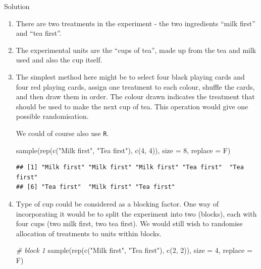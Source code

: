 \documentclass[
]{book}
\newenvironment{Shaded}{\begin{snugshade}}{\end{snugshade}}
\newcommand{\AttributeTok}[1]{\textcolor[rgb]{0.77,0.63,0.00}{#1}}
\newcommand{\CommentTok}[1]{\textcolor[rgb]{0.56,0.35,0.01}{\textit{#1}}}
\newcommand{\DecValTok}[1]{\textcolor[rgb]{0.00,0.00,0.81}{#1}}
\newcommand{\FunctionTok}[1]{\textcolor[rgb]{0.00,0.00,0.00}{#1}}
\newcommand{\NormalTok}[1]{#1}
\newcommand{\StringTok}[1]{\textcolor[rgb]{0.31,0.60,0.02}{#1}}
\theoremstyle{definition}
\theoremstyle{definition}
\theoremstyle{definition}
\theoremstyle{definition}
\theoremstyle{remark}
\begin{document}
Solution

\begin{enumerate}
\def\labelenumi{\alph{enumi}.}
\item
  There are two treatments in the experiment - the two ingredients ``milk first'' and ``tea first''.
\item
  The experimental units are the ``cups of tea'', made up from the tea and milk used and also the cup itself.
\item
  The simplest method here might be to select four black playing cards and four red playing cards, assign one treatment to each colour, shuffle the cards, and then draw them in order. The colour drawn indicates the treatment that should be used to make the next cup of tea. This operation would give one possible randomisation.

  We could of course also use \texttt{R}.

\begin{Shaded}
\begin{Highlighting}[]
\FunctionTok{sample}\NormalTok{(}\FunctionTok{rep}\NormalTok{(}\FunctionTok{c}\NormalTok{(}\StringTok{"Milk first"}\NormalTok{, }\StringTok{"Tea first"}\NormalTok{), }\FunctionTok{c}\NormalTok{(}\DecValTok{4}\NormalTok{, }\DecValTok{4}\NormalTok{)), }\AttributeTok{size =} \DecValTok{8}\NormalTok{, }\AttributeTok{replace =}\NormalTok{ F)}
\end{Highlighting}
\end{Shaded}

\begin{verbatim}
## [1] "Milk first" "Milk first" "Milk first" "Tea first"  "Tea first" 
## [6] "Tea first"  "Milk first" "Tea first"
\end{verbatim}
\item
  Type of cup could be considered as a blocking factor. One way of incorporating it would be to split the experiment into two (blocks), each with four cups (two milk first, two tea first). We would still wish to randomise allocation of treatments to units within blocks.

\begin{Shaded}
\begin{Highlighting}[]
\CommentTok{\# block 1}
\FunctionTok{sample}\NormalTok{(}\FunctionTok{rep}\NormalTok{(}\FunctionTok{c}\NormalTok{(}\StringTok{"Milk first"}\NormalTok{, }\StringTok{"Tea first"}\NormalTok{), }\FunctionTok{c}\NormalTok{(}\DecValTok{2}\NormalTok{, }\DecValTok{2}\NormalTok{)), }\AttributeTok{size =} \DecValTok{4}\NormalTok{, }\AttributeTok{replace =}\NormalTok{ F)}
\end{Highlighting}
\end{Shaded}


\end{enumerate}
\end{document}
